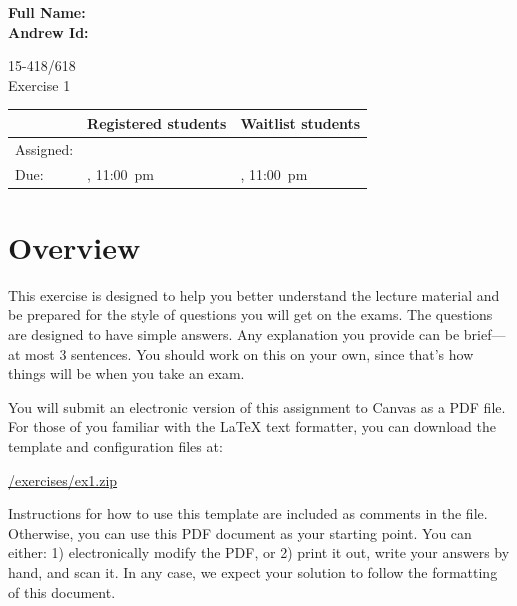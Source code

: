 \documentclass[11pt]{article}
\newcommand{\cref}[2]{\href{#1}{\color{blue}#2}}
\begin{document}
\begin{flushright}
{\large\bf Full Name: \makebox[2in][l]{

}} \\[1ex]

{\large\bf Andrew Id: \makebox[2in][l]{\tt

}} \\[1ex]
\end{flushright}
\vspace*{0.3in}
\begin{center}
\LARGE
15-418/618 \thisterm{} \\
Exercise 1
\\ 
\end{center}

\begin{center}
\Large
\begin{tabular}{lll}
\hline
 & Registered students & Waitlist students \\
\hline
Assigned: & \dateassigned{} & \dateassigned{} \\
Due: &  \datedueregistered{}, 11:00~pm & \dateduewaitlist{}, 11:00~pm \\
\hline
\end{tabular}
\end{center}

\section*{Overview}

This exercise is designed to help you better understand the lecture
material and be prepared for the style of questions you will get on
the exams.  The questions are designed to have simple answers.  Any
explanation you provide can be brief---at most 3 sentences.
You should work on this on your own, since that's how things will be when
you take an exam.

You will submit an electronic version of this assignment to Canvas as
a PDF file.  For those of you familiar with the \LaTeX{} text formatter, you can download the template and configuration files at:
\begin{center}
  \cref{\actualcoursehome/exercises/ex1.zip}{\visiblecoursehome/exercises/ex1.zip}\\
\end{center}
Instructions for how to use this template are included as comments in the file.  Otherwise,
you can use this PDF document as your starting point.
You can either: 1) electronically modify the PDF, or 2) print it
out, write your answers by hand, and scan it.  In any case, we expect
your solution to follow the formatting of this document.
\end{document}
